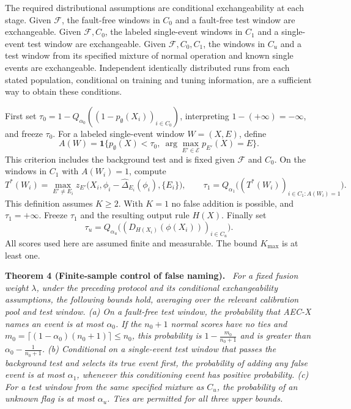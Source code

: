\documentclass[10pt]{article}
\newcommand{\aecx}{\textup{\textsc{AEC-X}}\xspace}
\newenvironment{result}[1]{\par\medskip\noindent\textbf{#1.}\ \itshape\ignorespaces}{\par\medskip}
\theoremstyle{plain}
\theoremstyle{remark}
\begin{document}
The required distributional assumptions are conditional exchangeability at each stage. Given $\mathcal F$, the fault-free windows in $C_0$ and a fault-free test window are exchangeable. Given $\mathcal F,C_0$, the labeled single-event windows in $C_1$ and a single-event test window are exchangeable. Given $\mathcal F,C_0,C_1$, the windows in $C_u$ and a test window from its specified mixture of normal operation and known single events are exchangeable. Independent identically distributed runs from each stated population, conditional on training and tuning information, are a sufficient way to obtain these conditions.

First set $\tau_0=1-Q_{\alpha_0}((1-p_\emptyset(X_i))_{i\in C_0})$, interpreting $1-(+\infty)=-\infty$, and freeze $\tau_0$. For a labeled single-event window $W=(X,E)$, define
\[
 A(W)=\mathbf1\{p_\emptyset(X)<\tau_0,\ \arg\max_{E'\in\mathcal E}p_{E'}(X)=E\}.
\]
This criterion includes the background test and is fixed given $\mathcal F$ and $C_0$. On the windows in $C_1$ with $A(W_i)=1$, compute
\[
 T^*(W_i)=\max_{E'\ne E_i}
 z_{E'}\bigl(X_i,\phi_i-\hat\Delta_{E_i}(\phi_i),\{E_i\}\bigr),
 \qquad
 \tau_1=Q_{\alpha_1}\bigl((T^*(W_i))_{i\in C_1:A(W_i)=1}\bigr).
\]
This definition assumes $K\ge2$. With $K=1$ no false addition is possible, and $\tau_1=+\infty$. Freeze $\tau_1$ and the resulting output rule $H(X)$. Finally set
\[
 \tau_u=Q_{\alpha_u}\bigl((D_{H(X_i)}(\phi(X_i)))_{i\in C_u}\bigr).
\]
All scores used here are assumed finite and measurable. The bound $K_{\max}$ is at least one.

\begin{result}{Theorem 4 (Finite-sample control of false naming)}
For a fixed fusion weight $\lambda$, under the preceding protocol and its conditional exchangeability assumptions, the following bounds hold, averaging over the relevant calibration pool and test window. (a) On a fault-free test window, the probability that \aecx names an event is at most $\alpha_0$. If the $n_0+1$ normal scores have no ties and $m_0=\lceil(1-\alpha_0)(n_0+1)\rceil\le n_0$, this probability is $1-\tfrac{m_0}{n_0+1}$ and is greater than $\alpha_0-\tfrac{1}{n_0+1}$. (b) Conditional on a single-event test window that passes the background test and selects its true event first, the probability of adding any false event is at most $\alpha_1$, whenever this conditioning event has positive probability. (c) For a test window from the same specified mixture as $C_u$, the probability of an unknown flag is at most $\alpha_u$. Ties are permitted for all three upper bounds.
\end{result}
\end{document}
